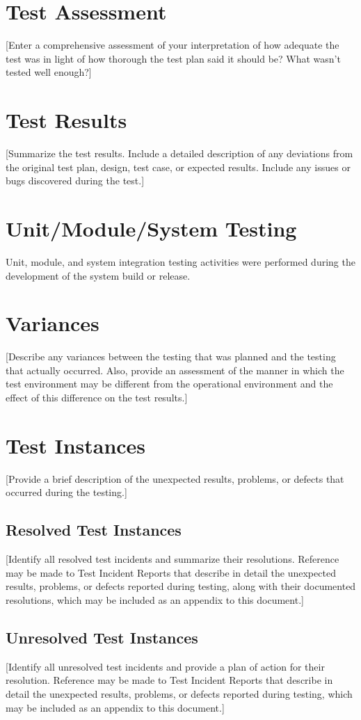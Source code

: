 \documentclass{l3deliverable}
\begin{document}
\section{Test Assessment}
[Enter a comprehensive assessment of your interpretation of how adequate the test was in light of how thorough the test plan said it should be? What wasn't tested well enough?]

\section{Test Results}
[Summarize the test results. Include a detailed description of any deviations from the original test plan, design, test case, or expected results. Include any issues or bugs discovered during the test.]

\section{Unit/Module/System Testing}
Unit, module, and system integration testing activities were performed during the development of the system build or release.

\section{Variances}
[Describe any variances between the testing that was planned and the testing that actually occurred.  Also, provide an assessment of the manner in which the test environment may be different from the operational environment and the effect of this difference on the test results.]

\section{Test Instances}
[Provide a brief description of the unexpected results, problems, or defects that occurred during the testing.]

\subsection{Resolved Test Instances}
[Identify all resolved test incidents and summarize their resolutions.  Reference may be made to Test Incident Reports that describe in detail the unexpected results, problems, or defects reported during testing, along with their documented resolutions, which may be included as an appendix to this document.]

\subsection{Unresolved Test Instances}
[Identify all unresolved test incidents and provide a plan of action for their resolution.  Reference may be made to Test Incident Reports that describe in detail the unexpected results, problems, or defects reported during testing, which may be included as an appendix to this document.]
\end{document}
